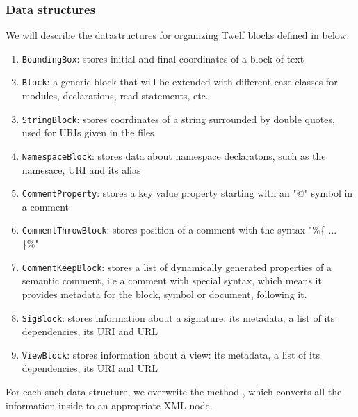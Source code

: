 \subsubsection{Data structures}

We will describe the datastructures  for organizing Twelf blocks defined in  below:

\begin{enumerate}
\item {\tt BoundingBox}: stores initial and final coordinates of a block of text 
\item {\tt Block}: a generic block that will be extended with different case classes for modules, declarations, read statements, etc.
\item {\tt StringBlock}: stores coordinates of a string surrounded by double quotes, used for URIs given in the files
\item {\tt NamespaceBlock}: stores data about namespace declaratons, such as the namesace, URI and its alias
\item {\tt CommentProperty}: stores a key value property starting with an "@" symbol in a comment
\item {\tt CommentThrowBlock}: stores position of a comment with the syntax "\%\{ ... \}\%"
\item {\tt CommentKeepBlock}: stores a list of dynamically generated properties of a semantic comment, i.e a comment with special syntax, which means it provides metadata for the block, symbol or document, following it.
\item{\tt SigBlock}: stores information about a signature: its metadata, a list of its dependencies, its URI and URL
\item{\tt ViewBlock}: stores  information about a view: its metadata, a list of its dependencies, its URI and URL
\end{enumerate}

For each such data structure, we overwrite the method , which converts all the information inside to an appropriate XML node.

